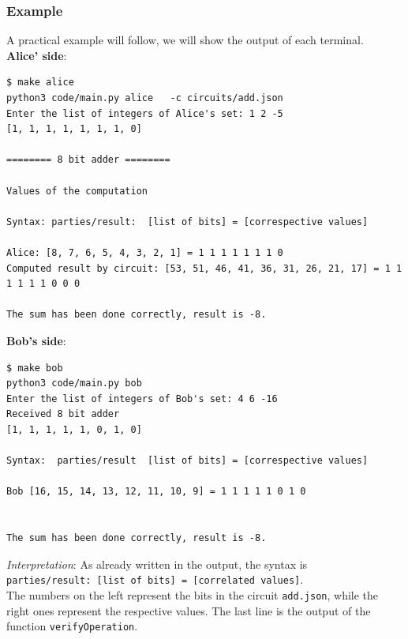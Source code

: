 \documentclass[12pt]{article}
\newcommand{\inlinecode}{\texttt}
\begin{document}
\subsubsection{Example}
A practical example will follow, we will show the output of each terminal.\\
\textbf{Alice' side}:
\begin{lstlisting}[frame=single, basicstyle=\scriptsize]
$ make alice
python3 code/main.py alice   -c circuits/add.json
Enter the list of integers of Alice's set: 1 2 -5
[1, 1, 1, 1, 1, 1, 1, 0]

======== 8 bit adder ========

Values of the computation

Syntax: parties/result:  [list of bits] = [correspective values]

Alice: [8, 7, 6, 5, 4, 3, 2, 1] = 1 1 1 1 1 1 1 0
Computed result by circuit: [53, 51, 46, 41, 36, 31, 26, 21, 17] = 1 1 1 1 1 1 0 0 0

The sum has been done correctly, result is -8.
\end{lstlisting}
\textbf{Bob's side}:
\begin{lstlisting}[frame=single, basicstyle=\scriptsize]
$ make bob
python3 code/main.py bob
Enter the list of integers of Bob's set: 4 6 -16
Received 8 bit adder
[1, 1, 1, 1, 1, 0, 1, 0]

Syntax:  parties/result  [list of bits] = [correspective values]

Bob [16, 15, 14, 13, 12, 11, 10, 9] = 1 1 1 1 1 0 1 0


The sum has been done correctly, result is -8.
\end{lstlisting}
\textit{Interpretation}: As already written in the output, the syntax is\\ \inlinecode{parties/result:  [list of bits] =   [correlated values]}. \vspace{2mm} \\
The numbers on the left represent the bits in the circuit \inlinecode{add.json}, while the right ones represent the respective values. The last line is the output of the function \inlinecode{verifyOperation}.



\end{document}
